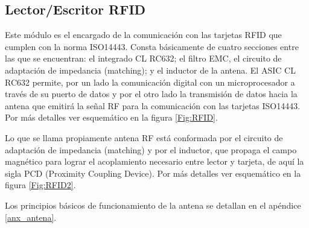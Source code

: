 \newpage
\subsection{Lector/Escritor RFID}
Este módulo es el encargado de la comunicación con las tarjetas RFID que cumplen con la norma ISO14443. Consta básicamente de cuatro secciones entre las que se encuentran: el integrado CL RC632; el filtro EMC, el circuito de adaptación de impedancia (matching); y el inductor de la antena. 
El ASIC CL RC632 permite, por un lado la comunicación digital con un microprocesador a través de su puerto de datos y por el otro lado la transmisión de datos hacia la antena que emitirá la señal RF para la comunicación con las tarjetas ISO14443.
Por más detalles ver esquemático en la figura \ref{Fig:RFID}.

Lo que se llama propiamente antena RF está conformada por el circuito de adaptación de impedancia (matching) y por el inductor, que propaga el campo magnético para lograr el acoplamiento necesario entre lector y tarjeta, de aquí la sigla PCD (Proximity Coupling Device).
Por más detalles ver esquemático en la figura \ref{Fig:RFID2}.

Los principios básicos de funcionamiento de la antena se detallan en el apéndice \ref{anx_antena}.

